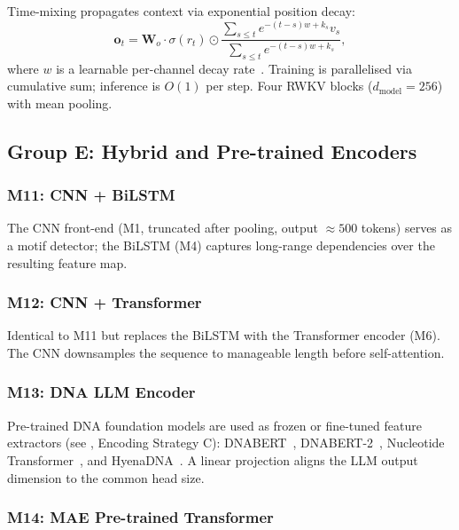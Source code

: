 Time-mixing propagates context via exponential position decay:
\begin{equation}
  \mathbf{o}_t = \mathbf{W}_o \cdot \sigma(r_t) \odot
    \frac{\sum_{s \leq t} e^{-(t-s)w+k_s} v_s}
         {\sum_{s \leq t} e^{-(t-s)w+k_s}},
\end{equation}
where $w$ is a learnable per-channel decay rate~\cite{rwkv}.
Training is parallelised via cumulative sum; inference is $O(1)$ per step.
Four RWKV blocks ($d_{\mathrm{model}} = 256$) with mean pooling.

\subsection{Group E: Hybrid and Pre-trained Encoders}

\subsubsection{M11: CNN + BiLSTM}

The CNN front-end (M1, truncated after pooling, output $\approx 500$ tokens) serves
as a motif detector; the BiLSTM (M4) captures long-range dependencies over the
resulting feature map.

\subsubsection{M12: CNN + Transformer}

Identical to M11 but replaces the BiLSTM with the Transformer encoder (M6).
The CNN downsamples the sequence to manageable length before self-attention.

\subsubsection{M13: DNA LLM Encoder}

Pre-trained DNA foundation models are used as frozen or fine-tuned feature
extractors (see , Encoding Strategy C):
DNABERT~\cite{dnabert}, DNABERT-2~\cite{dnabert2},
Nucleotide Transformer~\cite{nucleotide_transformer},
and HyenaDNA~\cite{hyenadna}.
A linear projection aligns the LLM output dimension to the common head size.

\subsubsection{M14: MAE Pre-trained Transformer}

